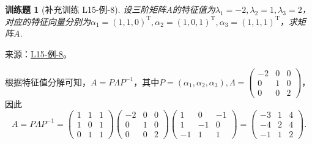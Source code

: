 \documentclass[UTF8,12pt,a4paper,fontset=fandol]{ctexart}
\newtheorem{exercise}{训练题}[section]
\begin{document}
\begin{exercise}[补充训练 L15-例-8]\label{prob:L15-例-8}
设三阶矩阵$A$的特征值为$\lambda_1=-2,\lambda_2=1,\lambda_3=2$，对应的特征向量分别为$\alpha_1=(1,1,0)^\mathrm{T},\alpha_2=(1,0,1)^\mathrm{T},\alpha_3=(1,1,1)^\mathrm{T}$，求矩阵$A$.
\end{exercise}
\noindent 来源：\href{https://github.com/yhwu-is/Linear-Algebra-Left-Undone/blob/new/%E8%AE%B2%E4%B9%89/%E4%B8%93%E9%A2%98/15%20%E7%9B%B8%E4%BC%BC%E6%A0%87%E5%87%86%E5%BD%A2%EF%BC%9A%E5%A4%8D%E6%95%B0%E5%9F%9F%E4%B8%8A%E7%9A%84%E5%B0%9D%E8%AF%95%E4%B8%8E%E7%90%86%E8%AE%BA.tex}{L15-例-8}。
\begin{solve}
根据特征值分解可知，$A=P\Lambda P^{-1}$，其中$P=(\alpha_1,\alpha_2,\alpha_3),\Lambda=\begin{pmatrix}
            -2 & 0 & 0 \\
            0  & 1 & 0 \\
            0  & 0 & 2
        \end{pmatrix}$，因此
    \[A=P\Lambda P^{-1}=\begin{pmatrix}
            1 & 1 & 1 \\
            1 & 0 & 1 \\
            0 & 1 & 1
        \end{pmatrix}\begin{pmatrix}
            -2 & 0 & 0 \\
            0  & 1 & 0 \\
            0  & 0 & 2
        \end{pmatrix}\begin{pmatrix}
            1  & 0  & -1 \\
            1  & -1 & 0  \\
            -1 & 1  & 1
        \end{pmatrix}=\begin{pmatrix}
            -3 & 1 & 4 \\
            -4 & 2 & 4 \\
            -1 & 1 & 2
        \end{pmatrix}.\]
\end{solve}
\end{document}
